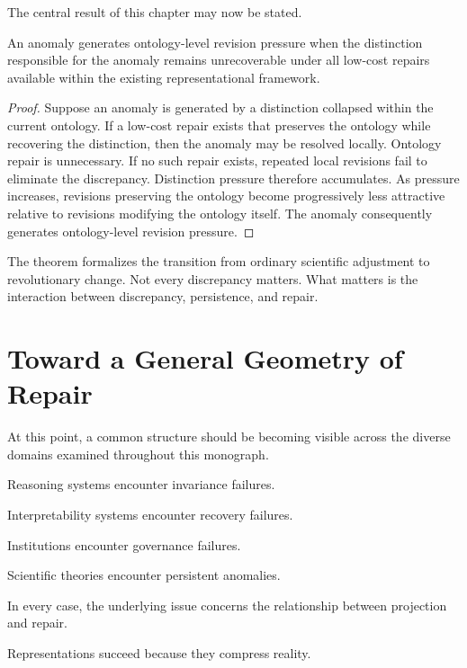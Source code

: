 \documentclass[11pt,oneside,openany]{book}
\begin{document}
The central result of this chapter may now be stated.

\begin{theorem}

An anomaly generates ontology-level revision pressure when the distinction responsible for the anomaly remains unrecoverable under all low-cost repairs available within the existing representational framework.

\end{theorem}

\begin{proof}

Suppose an anomaly is generated by a distinction collapsed within the current ontology. If a low-cost repair exists that preserves the ontology while recovering the distinction, then the anomaly may be resolved locally. Ontology repair is unnecessary. If no such repair exists, repeated local revisions fail to eliminate the discrepancy. Distinction pressure therefore accumulates. As pressure increases, revisions preserving the ontology become progressively less attractive relative to revisions modifying the ontology itself. The anomaly consequently generates ontology-level revision pressure.

\end{proof}

The theorem formalizes the transition from ordinary scientific adjustment to revolutionary change. Not every discrepancy matters. What matters is the interaction between discrepancy, persistence, and repair.

\section{Toward a General Geometry of Repair}

At this point, a common structure should be becoming visible across the diverse domains examined throughout this monograph.

Reasoning systems encounter invariance failures.

Interpretability systems encounter recovery failures.

Institutions encounter governance failures.

Scientific theories encounter persistent anomalies.

In every case, the underlying issue concerns the relationship between projection and repair.

Representations succeed because they compress reality.
\end{document}
